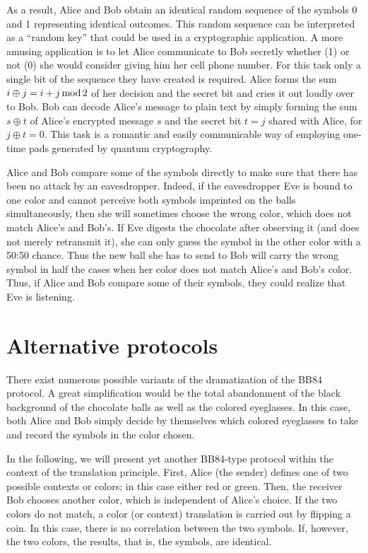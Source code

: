 \documentclass[prb,amssymb,preprint]{revtex4}
\begin{document}
As a result, Alice and Bob obtain an identical random sequence of the
symbols 0 and 1 representing identical outcomes.
This random
sequence can be interpreted as a ``random key'' that could be used in a
cryptographic application. A more amusing application is to let Alice
communicate to Bob secretly whether (1) or not (0) she would consider giving
him her cell phone number. For this task only a single bit of the
sequence they have created is required. Alice forms the sum $i\oplus j= i+j
\,{\rm mod}\, 2$ of her decision and the secret bit and cries it out loudly
over to Bob. Bob can decode Alice's message to plain text by simply forming
the sum $s\oplus t$ of Alice's encrypted message $s$ and the secret bit
$t=j$ shared with Alice, for $j\oplus t=0$. This task is a
romantic and easily communicable way of employing one-time pads generated by
quantum cryptography.

Alice and Bob compare some of the symbols directly to make sure that
there has been no attack by an eavesdropper. Indeed, if the eavesdropper Eve
is bound to one color and cannot perceive both symbols imprinted on the balls
simultaneously, then she will sometimes choose the wrong color, which does
not match Alice's and Bob's. If Eve digests the chocolate after observing
it (and does not merely retransmit it), she can only guess the symbol in the
other color with a 50:50 chance. Thus the new ball she has to send to Bob
will carry the wrong symbol in half the cases when her color does not
match Alice's and Bob's color. Thus, if Alice and Bob compare some of their
symbols, they could realize that Eve is listening.

\section{Alternative protocols}

There exist numerous possible variants of the dramatization of the BB84
protocol. A great simplification would be the total abandonment of the black
background of the chocolate balls as well as the colored eyeglasses. In
this case, both Alice and Bob simply decide by themselves which colored
eyeglasses to take and record the symbols in the color chosen.

In the following, we will present yet another BB84-type protocol
within the context of the translation principle.\cite{svozil-2003-garda}
First, Alice (the sender) defines one of two possible contexts or
colors; in this case either red or green.
Then, the receiver Bob chooses another color, which is independent of Alice's
choice. If the two colors do not match, a color (or context\cite{svozil-2003-garda})
translation
is carried out by flipping a coin. In this case, there is
no correlation between the two symbols. If, however, the two colors, the
results, that is, the symbols, are identical.
\end{document}
